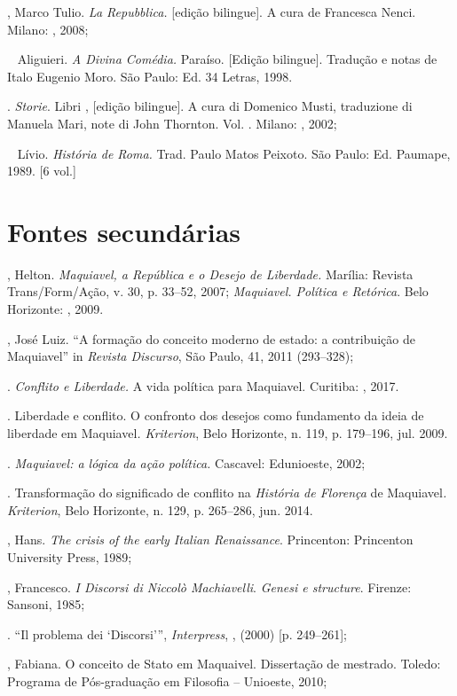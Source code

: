 \begin{bibliohedra}
, Marco Tulio. \emph{La Repubblica.} {[}edição bilingue{]}. A cura
de Francesca Nenci. Milano: , 2008;

\mbox{ } Aliguieri. \emph{A Divina Comédia.} Paraíso. {[}Edição
bilingue{]}. Tradução e notas de Italo Eugenio Moro. São Paulo: Ed. 34
Letras, 1998.

. \emph{Storie}. Libri , {[}edição bilingue{]}. A cura di
Domenico Musti, traduzione di Manuela Mari, note di John Thornton. Vol.
. Milano: , 2002;

\mbox{ } Lívio. \emph{História de Roma.} Trad. Paulo Matos Peixoto. São
Paulo: Ed. Paumape, 1989. {[}6 vol.{]}

\section*{Fontes secundárias}

, Helton. \emph{Maquiavel, a República e o Desejo de Liberdade.}
Marília: Revista Trans/Form/Ação, v. 30, p. 33--52, 2007;
\emph{Maquiavel. Política e Retórica}. Belo Horizonte: , 2009.

, José Luiz. ``A formação do conceito moderno de estado: a
contribuição de Maquiavel'' in \emph{Revista Discurso}, São Paulo, 41,
2011 (293--328);

\titidem. \emph{Conflito e Liberdade.} A vida política para
Maquiavel. Curitiba: , 2017.

\titidem. Liberdade e conflito. O confronto dos desejos como
fundamento da ideia de liberdade em Maquiavel\emph{. Kriterion}, Belo
Horizonte, n. 119, p. 179--196, jul. 2009.

\titidem. \emph{Maquiavel: a lógica da ação política.} Cascavel:
Edunioeste, 2002;

\titidem. Transformação do significado de conflito na
\emph{História de Florença} de Maquiavel\emph{. Kriterion}, Belo
Horizonte, n. 129, p. 265--286, jun. 2014.

, Hans. \emph{The crisis of the early Italian Renaissance}.
Princenton: Princenton University Press, 1989;

, Francesco. \emph{I Discorsi di Niccolò Machiavelli}. \emph{Genesi
e structure}. Firenze: Sansoni, 1985;

\titidem. ``Il problema dei `Discorsi''', \emph{Interpress},
, (2000) {[}p. 249--261{]};

, Fabiana. O conceito de Stato em Maquaivel. Dissertação de
mestrado. Toledo: Programa de Pós-graduação em Filosofia -- Unioeste,
2010;


\end{bibliohedra}
